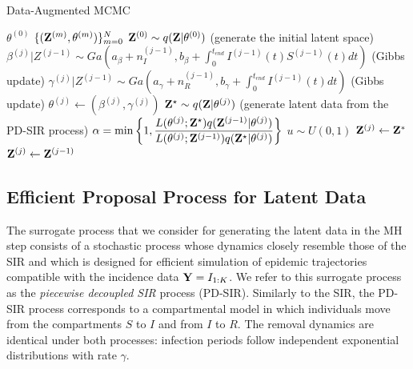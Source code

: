 \documentclass[11pt]{article}
\begin{document}
	\begin{algorithm}
		\caption{Data-Augmented MCMC}
		\label{alg:DA-MCMC}
		\begin{algorithmic}
			\REQUIRE $\theta^{(0)}$
			\RETURN $\{(\mathbf{Z}^{(m)}, \theta^{(m)})\}_{m=0}^N$ 
			\STATE $\mathbf{Z}^{(0)} \sim q(\mathbf{Z}|\theta^{(0)})$ (generate the initial latent space)
			\STATE $\beta^{(j)}|Z^{(j - 1)} \sim Ga\left( a_{\beta} + n_I^{(j - 1)}, b_{\beta} + \int_{0}^{t_{end}} I^{(j - 1)}(t)S^{(j - 1)}(t)dt\right)$ (Gibbs update)
			\STATE $\gamma^{(j)}|Z^{(j-1)} \sim Ga\left( a_{\gamma} + n_R^{(j - 1)}, b_{\gamma} + \int_{0}^{t_{end}} I^{(j - 1)}(t) dt\right)$ (Gibbs update)
			\STATE $\theta^{(j)} \leftarrow (\beta^{(j)}, \gamma^{(j)})$
			\STATE $\mathbf{Z}^\star \sim q(\mathbf{Z}|\theta^{(j)})$ (generate latent data from the PD-SIR process)
			\STATE $\alpha = \min\left\lbrace 1, \dfrac{L(\theta^{(j)}; \mathbf{Z}^\star)q(\mathbf{Z}^{(j - 1)}|\theta^{(j)})}{L(\theta^{(j)}; \mathbf{Z}^{(j - 1)})q(\mathbf{Z}^\star|\theta^{(j)})}\right\rbrace  $
			\STATE $u \sim U(0,1)$
			\STATE $\mathbf{Z}^{(j)} \leftarrow \mathbf{Z}^*$			
			\ELSE
			\STATE $\mathbf{Z}^{(j)} \leftarrow \mathbf{Z}^{(j - 1)}$
			\ENDIF
			\ENDFOR
		\end{algorithmic}
	\end{algorithm}
	
	\subsection{Efficient Proposal Process for Latent Data}
	\label{sec:pds}

	The surrogate process that we consider for generating the latent data in the MH step consists of a stochastic process whose dynamics closely resemble those of the SIR and which is designed for efficient simulation of epidemic trajectories compatible with the incidence data $\mathbf{Y} = I_{1:K}$. We refer to this surrogate process as the \textit{piecewise decoupled SIR} process (PD-SIR).
	Similarly to the SIR, the PD-SIR process corresponds to a compartmental model in which individuals move from the compartments $S$ to $I$ and from $I$ to $R$.
	The removal dynamics are identical under both processes: infection periods follow independent exponential distributions with rate $\gamma$.
	
\end{document}
